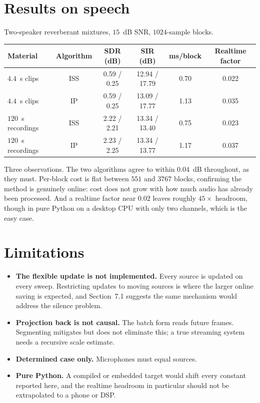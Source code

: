 \documentclass[11pt,a4paper]{article}
\begin{document}
\section{Results on speech}

Two-speaker reverberant mixtures, $15$~dB SNR, $1024$-sample blocks.

\begin{table}[h]
\centering
\begin{tabular}{lccccc}
\toprule
Material & Algorithm & SDR (dB) & SIR (dB) & ms/block & Realtime factor \\
\midrule
$4.4$~s clips & ISS & 0.59 / 0.25 & 12.94 / 17.79 & 0.70 & 0.022 \\
$4.4$~s clips & IP & 0.59 / 0.25 & 13.09 / 17.77 & 1.13 & 0.035 \\
$120$~s recordings & ISS & 2.22 / 2.21 & 13.34 / 13.40 & 0.75 & 0.023 \\
$120$~s recordings & IP & 2.23 / 2.25 & 13.34 / 13.77 & 1.17 & 0.037 \\
\bottomrule
\end{tabular}
\end{table}

Three observations. The two algorithms agree to within $0.04$~dB throughout, as
they must. Per-block cost is flat between $551$ and $3767$ blocks, confirming
the method is genuinely online: cost does not grow with how much audio has
already been processed. And a realtime factor near $0.02$ leaves roughly
$45\times$ headroom, though in pure Python on a desktop CPU with only two
channels, which is the easy case.

\section{Limitations}
\label{sec:limitations}

\begin{itemize}
\item \textbf{The flexible update is not implemented.} Every source is updated on
every sweep. Restricting updates to moving sources is where the larger online
saving is expected, and Section~7.1 suggests the same mechanism would address
the silence problem.
\item \textbf{Projection back is not causal.} The batch form reads future frames.
Segmenting mitigates but does not eliminate this; a true streaming system needs
a recursive scale estimate.
\item \textbf{Determined case only.} Microphones must equal sources.
\item \textbf{Pure Python.} A compiled or embedded target would shift every
constant reported here, and the realtime headroom in particular should not be
extrapolated to a phone or DSP.
\end{itemize}
\end{document}
